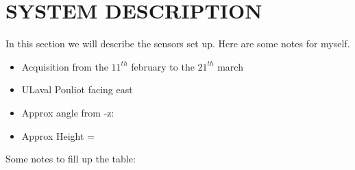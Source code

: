 \section{SYSTEM DESCRIPTION}

In this section we will describe the sensors set up. Here are some notes for myself.

\begin{itemize}
    \item Acquisition from the $11^{th}$ february to the $21^{th}$ march
    \item ULaval Pouliot facing east
    \item Approx angle from -z:
    \item Approx Height =
\end{itemize}

Some notes to fill up the table:
